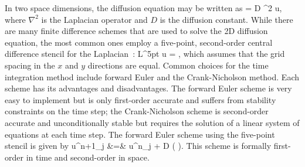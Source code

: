 \documentclass[oneeqnum,onefignum,onetabnum,onethmnum]{siamltex}
\begin{document}
In two space dimensions, the diffusion equation may be written as
\beq
   = D \nabla^2 u,
  \label{eq:diffusion_eqn_2d}
\eeq
where $\nabla^2$ is the Laplacian operator and $D$ is the diffusion constant. 
While there are many finite difference schemes that are used to solve the 
2D diffusion equation, the most common ones employ a five-point, second-order 
central difference stencil for the Laplacian~\cite{iserles_book}:
\beq
  L^{5pt} u = ,
  \label{eq:laplacian_2d_5pt_stencil}
\eeq
which assumes that the grid spacing in the $x$ and $y$ directions are
equal.  Common choices for the time integration method include forward Euler
and the Crank-Nicholson method.  Each scheme has its advantages and
disadvantages.  The forward Euler scheme is very easy to implement but is 
only first-order accurate and suffers from stability constraints on the time 
step; the Crank-Nicholson scheme is second-order accurate and unconditionally 
stable but requires the solution of a linear system of equations at each time 
step.  The forward Euler scheme using the five-point stencil is given by
\bea
  u^{n+1}_j &=& u^{n}_j 
  + D \dt 
    \left( 
    \right).
  \label{eq:diffusion_eqn_2d_5pt_scheme}
\eea
This scheme is formally first-order in time and second-order in space.
\end{document}

